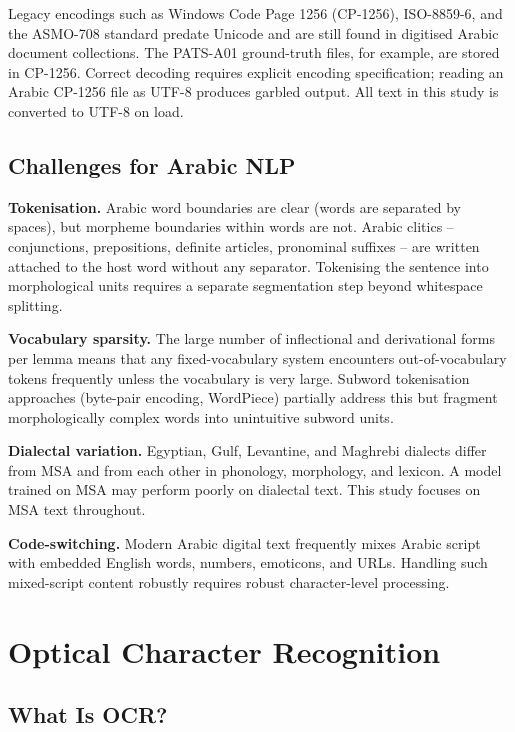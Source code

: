 Legacy encodings such as Windows Code Page 1256 (CP-1256), ISO-8859-6, and the
ASMO-708 standard predate Unicode and are still found in digitised Arabic
document collections.
The PATS-A01 ground-truth files, for example, are stored in CP-1256.
Correct decoding requires explicit encoding specification; reading an Arabic
CP-1256 file as UTF-8 produces garbled output.
All text in this study is converted to UTF-8 on load.

\subsection{Challenges for Arabic NLP}
\label{subsec:arabic_nlp_challenges}

\textbf{Tokenisation.}
Arabic word boundaries are clear (words are separated by spaces), but
morpheme boundaries within words are not.
Arabic clitics -- conjunctions, prepositions, definite articles, pronominal
suffixes -- are written attached to the host word without any separator.
Tokenising the sentence into morphological units requires a separate
segmentation step beyond whitespace splitting.

\textbf{Vocabulary sparsity.}
The large number of inflectional and derivational forms per lemma means that
any fixed-vocabulary system encounters out-of-vocabulary tokens frequently
unless the vocabulary is very large.
Subword tokenisation approaches (byte-pair encoding, WordPiece) partially
address this but fragment morphologically complex words into unintuitive
subword units.

\textbf{Dialectal variation.}
Egyptian, Gulf, Levantine, and Maghrebi dialects differ from MSA and from each
other in phonology, morphology, and lexicon.
A model trained on MSA may perform poorly on dialectal text.
This study focuses on MSA text throughout.

\textbf{Code-switching.}
Modern Arabic digital text frequently mixes Arabic script with embedded
English words, numbers, emoticons, and URLs.
Handling such mixed-script content robustly requires robust character-level
processing.

\section{Optical Character Recognition}
\label{sec:ocr}

\subsection{What Is OCR?}
\label{subsec:ocr_what}

